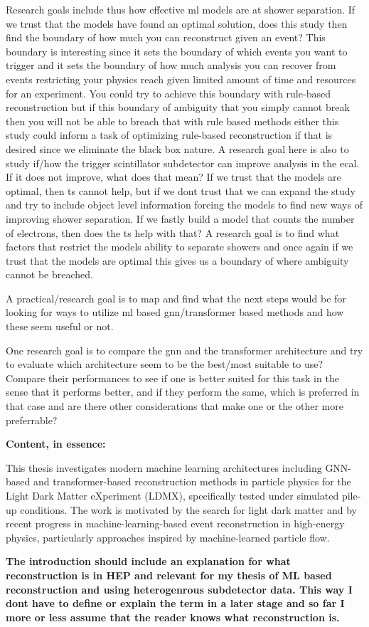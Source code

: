 {Research goals include thus how effective ml models are at shower separation. If we trust that the models have found an optimal solution, does this study then find the boundary of how much you can reconstruct given an event? This boundary is interesting since it sets the boundary of which events you want to trigger and it sets the boundary of how much analysis you can recover from events restricting your physics reach given limited amount of time and resources for an experiment. You could try to achieve this boundary with rule-based reconstruction but if this boundary of ambiguity that you simply cannot break then you will not be able to breach that with rule based methods either this study could inform a task of optimizing rule-based reconstruction if that is desired since we eliminate the black box nature. A research goal here is also to study if/how the trigger scintillator subdetector can improve analysis in the ecal. If it does not improve, what does that mean? If we trust that the models are optimal, then ts cannot help, but if we dont trust that we can expand the study and try to include object level information forcing the models to find new ways of improving shower separation. If we fastly build a model that counts the number of electrons, then does the ts help with that? A research goal is to find what factors that restrict the models ability to separate showers and once again if we trust that the models are optimal this gives us a boundary of where ambiguity cannot be breached. 

A practical/research goal is to map and find what the next steps would be for looking for ways to utilize ml based gnn/transformer based methods and how these seem useful or not.

One research goal is to compare the gnn and the transformer architecture and try to evaluate which architecture seem to be the best/most suitable to use? Compare their performances to see if one is better suited for this task in the sense that it performs better, and if they perform the same, which is preferred in that case and are there other considerations that make one or the other more preferrable? 

}


\textbf{Content, in essence:}

This thesis investigates modern machine learning architectures including GNN-based and transformer-based reconstruction methods in particle physics for the Light Dark Matter eXperiment (LDMX), specifically tested under simulated pile-up conditions. The work is motivated by the search for light dark matter  and by recent progress in machine-learning-based event reconstruction in high-energy physics, particularly approaches inspired by machine-learned particle flow.


\textbf{The introduction should include an explanation for what reconstruction is in HEP and relevant for my thesis of ML based reconstruction and using heterogenrous subdetector data. This way I dont have to define or explain the term in a later stage and so far I more or less assume that the reader knows what reconstruction is. }



